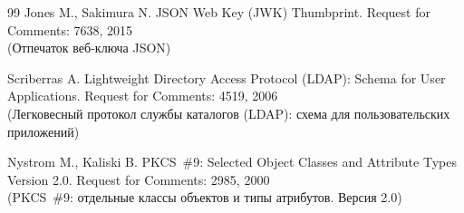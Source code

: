 \begin{thebibliography}{99}
Jones M., Sakimura N.
JSON Web Key (JWK) Thumbprint.
Request for Comments: 7638, 2015\\
{\small (Отпечаток веб-ключа JSON)}  

Scriberras A.
Lightweight Directory Access Protocol (LDAP):
Schema for User Applications.
Request for Comments: 4519, 2006\\
{\small (Легковесный протокол службы каталогов (LDAP): схема для 
пользовательских приложений)}  

Nystrom M., Kaliski B.
PKCS~\#9: Selected Object Classes and Attribute Types Version 2.0.
Request for Comments: 2985, 2000\\
{\small (PKCS~\#9: отдельные классы объектов и типы атрибутов. Версия 2.0)}  

\label{LastBib}
\end{thebibliography}

